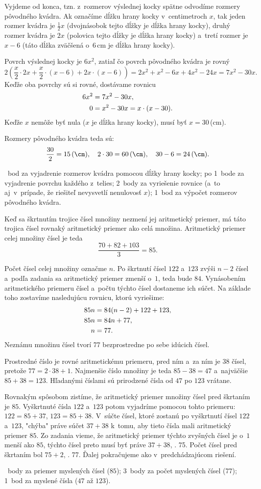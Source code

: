 {%
Vyjdeme od konca, tzn. z~rozmerov výslednej kocky spätne odvodíme rozmery
pôvodného kvádra.
Ak označíme dĺžku hrany kocky v~centimetroch $x$, tak jeden rozmer
kvádra je $\frac12x$ (dvojnásobok tejto dĺžky je dĺžka hrany kocky),
druhý rozmer kvádra je $2x$ (polovica tejto dĺžky je dĺžka hrany kocky)
a~tretí rozmer je $x-6$ (táto dĺžka zväčšená o~6\,cm je dĺžka hrany kocky).

Povrch výslednej kocky je $6x^2$, zatiaľ čo povrch pôvodného kvádra je rovný
$$
2\left(\frac{x}2\cdot2x+\frac{x}2\cdot(x-6)+2x\cdot(x-6)\right)
=2x^2+x^2-6x+4x^2-24x
=7x^2-30x.
$$
Keďže oba povrchy sú si rovné, dostávame rovnicu
$$
\aligned
6x^2&=7x^2-30x,\\
0&=x^2-30x=x\cdot(x-30).
\endaligned
$$
Keďže $x$ nemôže byť nula ($x$ je dĺžka hrany kocky), musí byť
$x=30$\,(cm).

Rozmery pôvodného kvádra teda sú:
$$
\frac{30}2=15\,(\cm),\quad
2\cdot30=60\,(\cm),\quad
30-6=24\,(\cm).
$$

~bod za vyjadrenie rozmerov kvádra pomocou dĺžky hrany kocky;
po 1~bode za vyjadrenie povrchu každého z~telies;
2~body za vyriešenie rovnice (a~to aj~v~prípade, že riešiteľ nevysvetlí
nenulovosť $x$);
1~bod za výpočet rozmerov pôvodného kvádra.
\endhodnotenie
}

{%
Keď sa škrtnutím trojice čísel množiny nezmení jej aritmetický priemer, má
táto trojica čísel rovnaký aritmetický priemer ako celá množina.
Aritmetický priemer celej množiny čísel je teda
$$
\frac{70+82+103}3=85.
$$

Počet čísel celej množiny označme $n$.
Po škrtnutí čísel $122$ a~$123$ zvýši $n-2$ čísel a~podľa zadania sa aritmetický priemer zmenší o~$1$, teda bude $84$.
Vynásobením aritmetického priemeru čísel a~počtu týchto čísel dostaneme
ich súčet.
Na základe toho zostavíme nasledujúcu rovnicu, ktorú vyriešime:
$$
\aligned
85n&=84(n-2)+122+123,\\
85n&=84n+77,\\
n&=77.
\endaligned
$$
Neznámu množinu čísel tvorí 77 bezprostredne po sebe idúcich čísel.

Prostredné číslo je rovné aritmetickému priemeru, pred ním a~za ním je 38 čísel,
pretože $77=2\cdot38+1$.
Najmenšie číslo množiny je teda $85-38=47$ a~najväčšie $85+38=123$.
Hľadanými číslami sú prirodzené čísla od $47$ po $123$ vrátane.

\ineriesenie
Rovnakým spôsobom zistíme, že aritmetický priemer množiny čísel pred škrtaním je $85$.
Vyškrtnuté čísla $122$ a~$123$ potom vyjadríme pomocou tohto priemeru: $122=85+37$,
$123=85+38$.
V~súčte čísel, ktoré zostanú po vyškrtnutí čísel $122$ a~$123$, "chýba"
práve súčet $37+38$ k~tomu, aby tieto čísla mali aritmetický priemer $85$.
Zo zadania vieme, že aritmetický priemer týchto zvyšných čísel je o~$1$ menší ako
$85$, týchto čísel preto musí byť práve $37+38$, \tj. 75.
Počet čísel pred škrtaním bol $75+2$, \tj. 77.
Ďalej pokračujeme ako v~predchádzajúcom riešení.

~body za priemer myslených čísel ($85$);
3~body za počet myslených čísel (77);
1~bod za myslené čísla ($47$ až $123$).
\endhodnotenie
}

